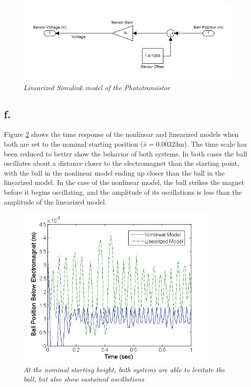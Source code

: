 \documentclass{article}
\theoremstyle{plain}
\theoremstyle{definition}
\theoremstyle{remark}
\begin{document}
\begin{figure}
\begin{center}
\includegraphics[width = 15cm]{LinearUnControlledSensor.jpg}
\caption{\emph{Linearized Simulink model of the Phototransistor}}
\label{Q1_e9}
\end{center}
\end{figure}



\subsection*{f.}
Figure \ref{Q1_f1} shows the time response of the nonlinear and linearized models when both are set to the nominal starting position ($\bar{x} = 0.00323$m). The time scale has been reduced to better show the behavior of both systems. In both cases the ball oscillates about a distance closer to the electromagnet than the starting point, with the ball in the nonlinear model ending up closer than the ball in the linearized model. In the case of the nonlinear model, the ball strikes the magnet before it begins oscillating, and the amplitude of its oscillations is less than the amplitude of the linearized model.\\
\begin{figure}[htb]
\begin{center}
\includegraphics[width = 10cm]{Part1fNoDisturbance.jpg}
\caption{\emph{At the nominal starting height, both systems are able to levitate the ball, but also show sustained oscillations }}
\label{Q1_f1}
\end{center}
\end{figure}
\end{document}
